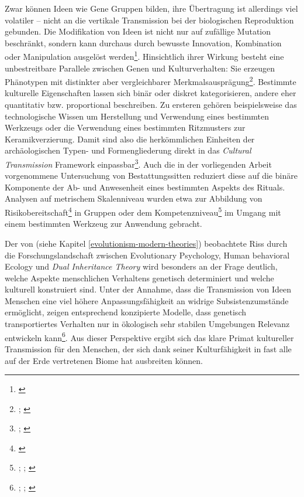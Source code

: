 \documentclass[openany,twoside,twocolumn]{book}
\let\rmarkdownfootnote\footnote%
\def\footnote{\protect\rmarkdownfootnote}
\begin{document}
Zwar können Ideen wie Gene Gruppen bilden, ihre Übertragung ist
allerdings viel volatiler -- nicht an die vertikale Transmission bei der
biologischen Reproduktion gebunden. Die Modifikation von Ideen ist nicht
nur auf zufällige Mutation beschränkt, sondern kann durchaus durch
bewusste Innovation, Kombination oder Manipulation ausgelöst
werden\footnote{\textcite{eerkens_cultural_2007}}. Hinsichtlich ihrer
Wirkung besteht eine unbestreitbare Parallele zwischen Genen und
Kulturverhalten: Sie erzeugen Phänotypen mit distinkter aber
vergleichbarer Merkmalsausprägung\footnote{\textcite{lyman_culture_2001};
  \textcite{lyman_rise_1997}}. Bestimmte kulturelle Eigenschaften lassen
sich binär oder diskret kategorisieren, andere eher quantitativ bzw.
proportional beschreiben. Zu ersteren gehören beispielsweise das
technologische Wissen um Herstellung und Verwendung eines bestimmten
Werkzeugs oder die Verwendung eines bestimmten Ritzmusters zur
Keramikverzierung. Damit sind also die herkömmlichen Einheiten der
archäologischen Typen- und Formengliederung direkt in das \emph{Cultural
Transmission} Framework einpassbar\footnote{\textcite{lipo_science_2001};
  \textcite{lyman_cultural_2003}}. Auch die in der vorliegenden Arbeit
vorgenommene Untersuchung von Bestattungssitten reduziert diese auf die
binäre Komponente der Ab- und Anwesenheit eines bestimmten Aspekts des
Rituals. Analysen auf metrischem Skalenniveau wurden etwa zur Abbildung
von Risikobereitschaft\footnote{\textcite{bisin_economics_2001-1}} in
Gruppen oder dem Kompetenzniveau\footnote{\textcite{baldini_revisiting_2015};
  \textcite{henrich_demography_2004};
  \textcite{kobayashi_innovativeness_2012}} im Umgang mit einem
bestimmten Werkzeug zur Anwendung gebracht.

Der von \textcite{smith_three_2000} (siehe Kapitel
\ref{evolutionism-modern-theories}) beobachtete Riss durch die
Forschungslandschaft zwischen Evolutionary Psychology, Human behavioral
Ecology und \emph{Dual Inheritance Theory} wird besonders an der Frage
deutlich, welche Aspekte menschlichen Verhaltens genetisch determiniert
und welche kulturell konstruiert sind. Unter der Annahme, dass die
Transmission von Ideen Menschen eine viel höhere Anpassungsfähigkeit an
widrige Subsistenzumstände ermöglicht, zeigen entsprechend konzipierte
Modelle, dass genetisch transportiertes Verhalten nur in ökologisch sehr
stabilen Umgebungen Relevanz entwickeln kann\footnote{\textcite{aoki_emergence_2005};
  \textcite{aoki_evolution_2014}; \textcite{boyd_cultural_1983}}. Aus
dieser Perspektive ergibt sich das klare Primat kultureller Transmission
für den Menschen, der sich dank seiner Kulturfähigkeit in fast alle auf
der Erde vertretenen Biome hat ausbreiten können.
\end{document}
